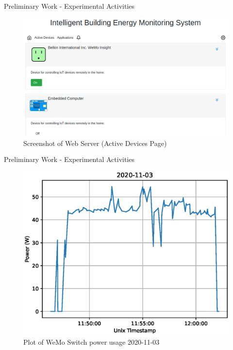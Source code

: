 \documentclass{beamer}
\begin{document}
\begin{frame}{Preliminary Work - Experimental Activities}{}
    \begin{figure}
        \centering
        \includegraphics[scale=0.3]{figs/activeDevicesWithEmbeddedPicture.png}
        \caption{Screenshot of Web Server (Active Devices Page)}
        \label{fig:my_label}
    \end{figure}
\end{frame}

\begin{frame}{Preliminary Work - Experimental Activities}{}
    \begin{figure}
        \centering
        \includegraphics[scale=0.5]{figs/powerPlot2020-11-03.eps}
        \caption{Plot of WeMo Switch power usage 2020-11-03}
        \label{fig:powerPlotWeMoSwitch}
    \end{figure}
\end{frame}
\end{document}
